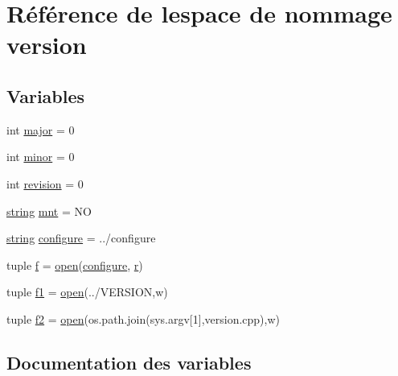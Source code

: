 \hypertarget{namespaceversion}{}\section{Référence de l\textquotesingle{}espace de nommage version}
\label{namespaceversion}
\subsection*{Variables}
\begin{DoxyCompactItemize}
\item 
int \hyperlink{namespaceversion_adfa78588540698359a6bd30edafdebd0}{major} = 0
\item 
int \hyperlink{namespaceversion_a8f0f39465202c345808fc95cfb1fb95d}{minor} = 0
\item 
int \hyperlink{namespaceversion_a0b01b3ed96b59423b250dfd07833301f}{revision} = 0
\item 
\hyperlink{tclscanner_8cpp_a3b18665bed369c4cf583afc1b05f583a}{string} \hyperlink{namespaceversion_ab493a0adfcc8c356b8ddd2c17709a770}{mnt} = \textquotesingle{}N\+O\textquotesingle{}
\item 
\hyperlink{tclscanner_8cpp_a3b18665bed369c4cf583afc1b05f583a}{string} \hyperlink{namespaceversion_aedc91fd7b4b027899ea1441123d88f96}{configure} = \textquotesingle{}../configure\textquotesingle{}
\item 
tuple \hyperlink{namespaceversion_adc2f36e5bef89e3881981af504e0e31d}{f} = \hyperlink{structcmd_8h_a2c4414339f388561554c2deab11a1a07}{open}(\hyperlink{namespaceversion_aedc91fd7b4b027899ea1441123d88f96}{configure}, \textquotesingle{}\hyperlink{060__command__switch_8tcl_a0a0bd3dc69dd06934c4e6362155e0ace}{r}\textquotesingle{})
\item 
tuple \hyperlink{namespaceversion_ae6011bf923c4ed95d1f1de5740caa956}{f1} = \hyperlink{structcmd_8h_a2c4414339f388561554c2deab11a1a07}{open}(\textquotesingle{}../V\+E\+R\+S\+I\+O\+N\textquotesingle{},\textquotesingle{}w\textquotesingle{})
\item 
tuple \hyperlink{namespaceversion_ab584c69a59e4cd6b0d5ac80b1f445303}{f2} = \hyperlink{structcmd_8h_a2c4414339f388561554c2deab11a1a07}{open}(os.\+path.\+join(sys.\+argv\mbox{[}1\mbox{]},\textquotesingle{}version.\+cpp\textquotesingle{}),\textquotesingle{}w\textquotesingle{})
\end{DoxyCompactItemize}


\subsection{Documentation des variables}
\hypertarget{namespaceversion_aedc91fd7b4b027899ea1441123d88f96}{}

